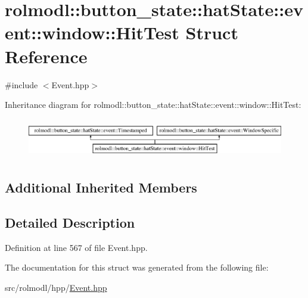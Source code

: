 \hypertarget{structrolmodl_1_1button__state_1_1hat_state_1_1event_1_1window_1_1_hit_test}{}\section{rolmodl\+::button\+\_\+state\+::hat\+State\+::event\+::window\+::Hit\+Test Struct Reference}
\label{structrolmodl_1_1button__state_1_1hat_state_1_1event_1_1window_1_1_hit_test}


{\ttfamily \#include $<$Event.\+hpp$>$}

Inheritance diagram for rolmodl\+::button\+\_\+state\+::hat\+State\+::event\+::window\+::Hit\+Test\+:\begin{figure}[H]
\begin{center}
\leavevmode
\includegraphics[height=1.761006cm]{structrolmodl_1_1button__state_1_1hat_state_1_1event_1_1window_1_1_hit_test}
\end{center}
\end{figure}
\subsection*{Additional Inherited Members}


\subsection{Detailed Description}


Definition at line 567 of file Event.\+hpp.



The documentation for this struct was generated from the following file\+:\begin{DoxyCompactItemize}
\item 
src/rolmodl/hpp/\mbox{\hyperlink{_event_8hpp}{Event.\+hpp}}\end{DoxyCompactItemize}
